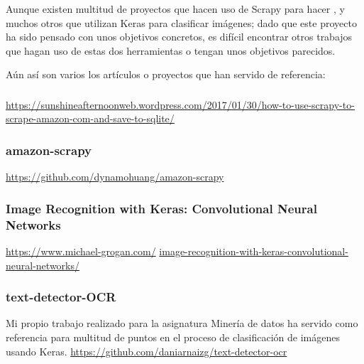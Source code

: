 
Aunque existen multitud de proyectos que hacen uso de Scrapy para hacer , y muchos otros que utilizan Keras para clasificar imágenes; dado que este proyecto ha sido pensado con unos objetivos concretos, es difícil encontrar otros trabajos que hagan uso de estas dos herramientas o tengan unos objetivos parecidos.

Aún así son varios los artículos o proyectos que han servido de referencia:

\subsubsection{}
\sloppy
\url{https://sunshineafternoonweb.wordpress.com/2017/01/30/how-to-use-scrapy-to-scrape-amazon-com-and-save-to-sqlite/}

\subsubsection{amazon-scrapy}
\url{https://github.com/dynamohuang/amazon-scrapy}

\subsubsection{Image Recognition with Keras: Convolutional Neural Networks}
\sloppy
\href{https://www.michael-grogan.com/image-recognition-with-keras-convolutional-neural-networks/}{https://www.michael-grogan.com/}
\linebreak
\url{image-recognition-with-keras-convolutional-neural-networks/}

\subsubsection{text-detector-OCR}
Mi propio trabajo realizado para la asignatura Minería de datos ha servido como referencia para multitud de puntos en el proceso de clasificación de imágenes usando Keras.\linebreak
\url{https://github.com/daniarnaizg/text-detector-ocr}
